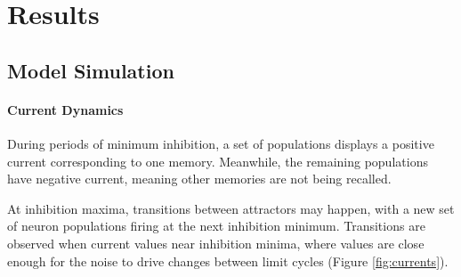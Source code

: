 \section{Results}

\subsection{Model Simulation}
    \paragraph{Current Dynamics}

    During periods of minimum inhibition, a set of populations displays a positive current corresponding to one memory.
    Meanwhile, the remaining populations have negative current, meaning other memories are not being recalled.

    At inhibition maxima, transitions between attractors may happen, with a new set of neuron populations firing at the next inhibition minimum.
    Transitions are observed when current values near inhibition minima, where values are close enough for the noise to drive changes between limit cycles (Figure \ref{fig:currents}).
    
